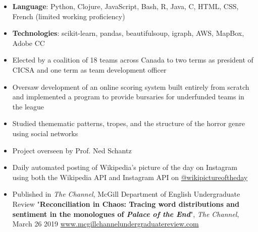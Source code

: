 \begin{itemize}
\item \textbf{Language}: Python, Clojure, JavaScript, Bash, R, Java, C, HTML, CSS, French (limited working proficiency)
\item \textbf{Technologies}: scikit-learn, pandas, beautifulsoup, igraph, AWS, MapBox, Adobe CC
\end{itemize}


\begin{itemize}
\item Elected by a coalition of 18 teams across Canada to two terms as president of CICSA and one term as team development officer
\item Oversaw development of an online scoring system built entirely from scratch and implemented a program to provide bursaries for underfunded teams in the league
\end{itemize}

\begin{itemize}
\item  Studied themematic patterns, tropes, and the structure of the horror genre using social networks
\item Project overseen by Prof. Ned Schantz
\end{itemize}
\begin{itemize}
\item Daily automated posting of Wikipedia's picture of the day on Instagram using both the Wikipedia API and Instagram API on \href{http://instagram.com/wikipictureoftheday}{@wikipictureoftheday}
\end{itemize}


\begin{itemize}
\item  Published in \textit{The Channel}, McGill Department of English Undergraduate Review "\textbf{Reconciliation in Chaos: Tracing word distributions and sentiment in the monologues of \textit{Palace of the End}}", \textit{The Channel}, March 26 2019 \href{http://mcgillchannelundergraduatereview.com/2019/03/reconciliation-in-chaos-tracing-word-distributions-and-sentiment-in-the-monologues-of-palace-of-the-end/}{www.mcgillchannelundergraduatereview.com}
\end{itemize}

